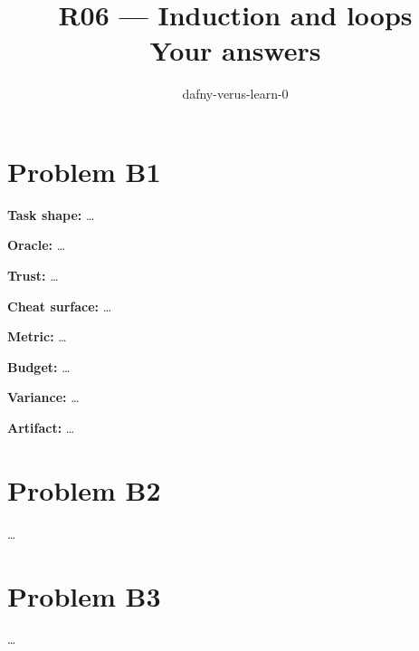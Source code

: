 \documentclass[11pt]{article}
\title{R06 --- Induction and loops \\ \large Your answers}
\author{dafny-verus-learn-0}
\date{}
\begin{document}
\maketitle
\section*{Problem B1}\label{ans:B1}
\begin{answer}
\textbf{Task shape:} \dots

\textbf{Oracle:} \dots

\textbf{Trust:} \dots

\textbf{Cheat surface:} \dots

\textbf{Metric:} \dots

\textbf{Budget:} \dots

\textbf{Variance:} \dots

\textbf{Artifact:} \dots
\end{answer}
\section*{Problem B2}\label{ans:B2}
\begin{answer}
\dots
\end{answer}
\section*{Problem B3}\label{ans:B3}
\begin{answer}
\dots
\end{answer}
\end{document}
